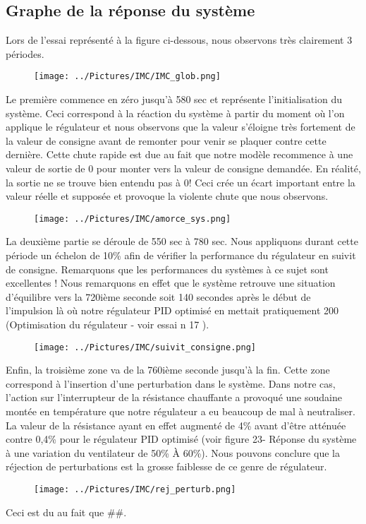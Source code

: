 \subsection{Graphe de la réponse du système}
Lors de l'essai représenté à la figure ci-dessous, nous observons très clairement 3 périodes.
\begin{figure}[H]
\texttt{[image: ../Pictures/IMC/IMC\_glob.png]}
\end{figure}
Le première commence en zéro jusqu'à 580 sec et représente l'initialisation du système. Ceci correspond à la réaction du système à partir du moment où l'on applique le régulateur et nous observons que la valeur s'éloigne très fortement de la valeur de consigne avant de remonter pour venir se plaquer contre cette dernière. Cette chute rapide est due au fait que notre modèle recommence à une valeur de sortie de 0 pour monter vers la valeur de consigne demandée. En réalité, la sortie ne se trouve bien entendu pas à 0! Ceci crée un écart important entre la valeur réelle et supposée et provoque la violente chute que nous observons.

\begin{figure}[H]
\texttt{[image: ../Pictures/IMC/amorce\_sys.png]}
\end{figure}
La deuxième partie se déroule de 550 sec à 780 sec. Nous appliquons durant cette période un échelon de 10\% afin de vérifier la performance du régulateur en suivit de consigne. Remarquons que les performances du systèmes à ce sujet sont excellentes ! Nous remarquons en effet que le système retrouve une situation d'équilibre vers la 720ième seconde soit 140 secondes après le début de l'impulsion là où notre régulateur PID optimisé en mettait pratiquement 200 (Optimisation du régulateur - voir essai n 17 ). 
\begin{figure}[H]
\texttt{[image: ../Pictures/IMC/suivit\_consigne.png]}
\end{figure}
Enfin, la troisième zone va de la 760ième seconde jusqu'à la fin. Cette zone correspond à l'insertion  d'une perturbation dans le système. Dans notre cas, l'action sur l'interrupteur de la résistance chauffante a provoqué une soudaine montée en température que notre régulateur a eu beaucoup de mal à neutraliser. La valeur de la résistance ayant en effet augmenté de 4\% avant d'être atténuée contre 0,4\% pour le régulateur PID optimisé (voir figure 23- Réponse du système à une variation du ventilateur de 50\% À 60\%). Nous pouvons conclure que la réjection de perturbations est la grosse faiblesse de ce genre de régulateur. 
\begin{figure}[H]
\texttt{[image: ../Pictures/IMC/rej\_perturb.png]}
\end{figure}
Ceci est du au fait que \#\#.
